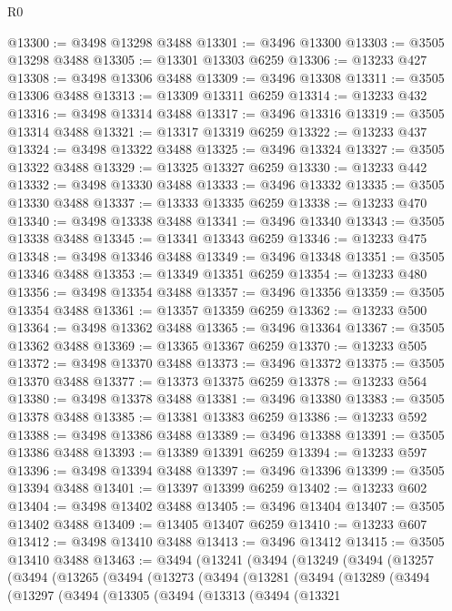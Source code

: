 \begin{lexlean}{R0}
\begin{coremodule}
@13300 := @3498 @13298 @3488
@13301 := @3496 @13300
@13303 := @3505 @13298 @3488
@13305 := @13301 @13303 @6259
@13306 := @13233 @427
@13308 := @3498 @13306 @3488
@13309 := @3496 @13308
@13311 := @3505 @13306 @3488
@13313 := @13309 @13311 @6259
@13314 := @13233 @432
@13316 := @3498 @13314 @3488
@13317 := @3496 @13316
@13319 := @3505 @13314 @3488
@13321 := @13317 @13319 @6259
@13322 := @13233 @437
@13324 := @3498 @13322 @3488
@13325 := @3496 @13324
@13327 := @3505 @13322 @3488
@13329 := @13325 @13327 @6259
@13330 := @13233 @442
@13332 := @3498 @13330 @3488
@13333 := @3496 @13332
@13335 := @3505 @13330 @3488
@13337 := @13333 @13335 @6259
@13338 := @13233 @470
@13340 := @3498 @13338 @3488
@13341 := @3496 @13340
@13343 := @3505 @13338 @3488
@13345 := @13341 @13343 @6259
@13346 := @13233 @475
@13348 := @3498 @13346 @3488
@13349 := @3496 @13348
@13351 := @3505 @13346 @3488
@13353 := @13349 @13351 @6259
@13354 := @13233 @480
@13356 := @3498 @13354 @3488
@13357 := @3496 @13356
@13359 := @3505 @13354 @3488
@13361 := @13357 @13359 @6259
@13362 := @13233 @500
@13364 := @3498 @13362 @3488
@13365 := @3496 @13364
@13367 := @3505 @13362 @3488
@13369 := @13365 @13367 @6259
@13370 := @13233 @505
@13372 := @3498 @13370 @3488
@13373 := @3496 @13372
@13375 := @3505 @13370 @3488
@13377 := @13373 @13375 @6259
@13378 := @13233 @564
@13380 := @3498 @13378 @3488
@13381 := @3496 @13380
@13383 := @3505 @13378 @3488
@13385 := @13381 @13383 @6259
@13386 := @13233 @592
@13388 := @3498 @13386 @3488
@13389 := @3496 @13388
@13391 := @3505 @13386 @3488
@13393 := @13389 @13391 @6259
@13394 := @13233 @597
@13396 := @3498 @13394 @3488
@13397 := @3496 @13396
@13399 := @3505 @13394 @3488
@13401 := @13397 @13399 @6259
@13402 := @13233 @602
@13404 := @3498 @13402 @3488
@13405 := @3496 @13404
@13407 := @3505 @13402 @3488
@13409 := @13405 @13407 @6259
@13410 := @13233 @607
@13412 := @3498 @13410 @3488
@13413 := @3496 @13412
@13415 := @3505 @13410 @3488
@13463 := @3494
    (@13241
      (@3494
        (@13249
          (@3494
            (@13257
              (@3494
                (@13265
                  (@3494
                    (@13273
                      (@3494
                        (@13281
                          (@3494
                            (@13289
                              (@3494
                                (@13297
                                  (@3494
                                    (@13305
                                      (@3494
                                        (@13313
                                          (@3494
                                            (@13321

\end{coremodule}
\end{lexlean}
